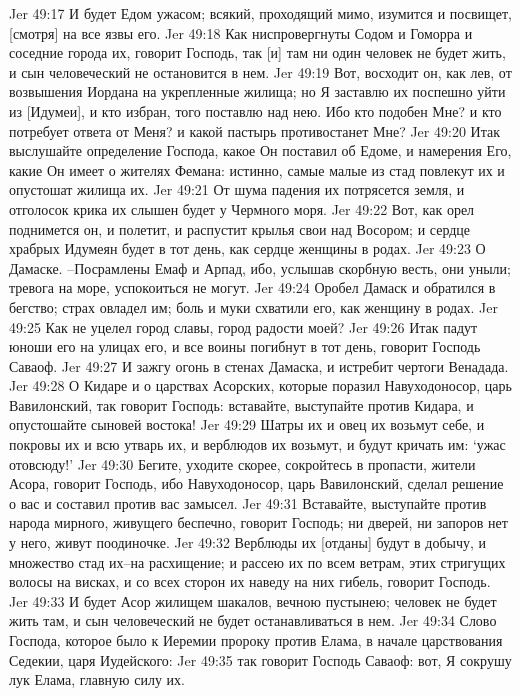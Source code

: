 Jer 49:17  И будет Едом ужасом; всякий, проходящий мимо, изумится и посвищет, [смотря] на все язвы его.
Jer 49:18  Как ниспровергнуты Содом и Гоморра и соседние города их, говорит Господь, так [и] там ни один человек не будет жить, и сын человеческий не остановится в нем.
Jer 49:19  Вот, восходит он, как лев, от возвышения Иордана на укрепленные жилища; но Я заставлю их поспешно уйти из [Идумеи], и кто избран, того поставлю над нею. Ибо кто подобен Мне? и кто потребует ответа от Меня? и какой пастырь противостанет Мне?
Jer 49:20  Итак выслушайте определение Господа, какое Он поставил об Едоме, и намерения Его, какие Он имеет о жителях Фемана: истинно, самые малые из стад повлекут их и опустошат жилища их.
Jer 49:21  От шума падения их потрясется земля, и отголосок крика их слышен будет у Чермного моря.
Jer 49:22  Вот, как орел поднимется он, и полетит, и распустит крылья свои над Восором; и сердце храбрых Идумеян будет в тот день, как сердце женщины в родах.
Jer 49:23  О Дамаске. --Посрамлены Емаф и Арпад, ибо, услышав скорбную весть, они уныли; тревога на море, успокоиться не могут.
Jer 49:24  Оробел Дамаск и обратился в бегство; страх овладел им; боль и муки схватили его, как женщину в родах.
Jer 49:25  Как не уцелел город славы, город радости моей?
Jer 49:26  Итак падут юноши его на улицах его, и все воины погибнут в тот день, говорит Господь Саваоф.
Jer 49:27  И зажгу огонь в стенах Дамаска, и истребит чертоги Венадада.
Jer 49:28  О Кидаре и о царствах Асорских, которые поразил Навуходоносор, царь Вавилонский, так говорит Господь: вставайте, выступайте против Кидара, и опустошайте сыновей востока!
Jer 49:29  Шатры их и овец их возьмут себе, и покровы их и всю утварь их, и верблюдов их возьмут, и будут кричать им: `ужас отовсюду!'
Jer 49:30  Бегите, уходите скорее, сокройтесь в пропасти, жители Асора, говорит Господь, ибо Навуходоносор, царь Вавилонский, сделал решение о вас и составил против вас замысел.
Jer 49:31  Вставайте, выступайте против народа мирного, живущего беспечно, говорит Господь; ни дверей, ни запоров нет у него, живут поодиночке.
Jer 49:32  Верблюды их [отданы] будут в добычу, и множество стад их--на расхищение; и рассею их по всем ветрам, этих стригущих волосы на висках, и со всех сторон их наведу на них гибель, говорит Господь.
Jer 49:33  И будет Асор жилищем шакалов, вечною пустынею; человек не будет жить там, и сын человеческий не будет останавливаться в нем.
Jer 49:34  Слово Господа, которое было к Иеремии пророку против Елама, в начале царствования Седекии, царя Иудейского:
Jer 49:35  так говорит Господь Саваоф: вот, Я сокрушу лук Елама, главную силу их.
